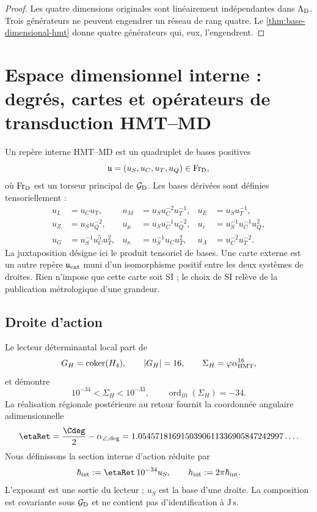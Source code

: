 \begin{proof}
Les quatre dimensions originales sont linéairement indépendantes dans
\(\Lambda_{\rm D}\). Trois générateurs ne peuvent engendrer un réseau de
rang quatre. Le \cref{thm:base-dimensional-hmt} donne quatre générateurs qui,
eux, l'engendrent.
\end{proof}

\section{Espace dimensionnel interne : degrés, cartes et opérateurs de transduction HMT–MD}

Un repère interne HMT--MD est un quadruplet de bases positives
\[
 \mathfrak u=(u_S,u_C,u_T,u_Q)
 \in\operatorname{Fr}_{\rm D},
\]
où \(\operatorname{Fr}_{\rm D}\) est un torseur principal de
\(\mathcal G_{\rm D}\). Les bases dérivées sont définies tensoriellement :
\begin{align*}
 u_L&=u_Cu_T,&
 u_M&=u_Su_C^{-2}u_T^{-1},&
 u_E&=u_Su_T^{-1},\\
 u_Z&=u_Su_Q^{-2},&
 u_\mu&=u_Su_C^{-1}u_Q^{-2},&
 u_\varepsilon&=u_S^{-1}u_C^{-1}u_Q^2,\\
 u_G&=u_S^{-1}u_C^5u_T^2,&
 u_\kappa&=u_S^{-1}u_Cu_T^2,&
 u_\Lambda&=u_C^{-2}u_T^{-2}.
\end{align*}
La juxtaposition désigne ici le produit tensoriel de bases. Une carte externe
est un autre repère \(\mathfrak u_{\rm ext}\) muni d'un isomorphisme positif
entre les deux systèmes de droites. Rien n'impose que cette carte soit SI ; le
choix de SI relève de la publication métrologique d'une grandeur.

\subsection{Droite d'action}

Le lecteur déterminantal local part de
\[
 G_H=\operatorname{coker}(H_4),
 \qquad |G_H|=16,
 \qquad \Sigma_H=\varphi\alpha_{\rm HMT}^{16},
\]
et démontre
\[
 10^{-34}<\Sigma_H<10^{-33},
 \qquad \operatorname{ord}_{10}(\Sigma_H)=-34.
\]
La réalisation régionale postérieure au retour fournit la coordonnée
angulaire adimensionnelle
\[
 \etaRet
 =\frac{\Cdeg}{2}-\alpha_{\angle,{\rm deg}}
 =1.0545718169150390611336905847242997\ldots.
\]
Nous définissons la section interne d'action réduite par
\begin{equation}
 \hbar_{\rm int}
 :=\etaRet\,10^{-34}u_S,
 \qquad
 h_{\rm int}:=2\pi\hbar_{\rm int}.
 \label{eq:accion-interna}
\end{equation}
L'exposant est une sortie du lecteur ; \(u_S\) est la base d'une droite.
La composition est covariante sous \(\mathcal G_{\rm D}\) et ne contient pas
d'identification à \(\mathrm{J\,s}\).

